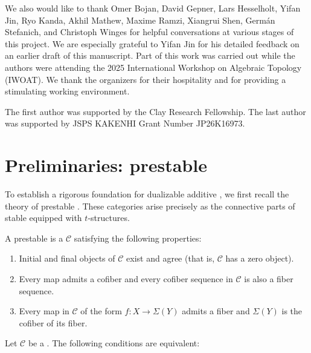 \documentclass[a4paper,10pt, oneside]{amsart}
\begin{document}
We also would like to thank Omer Bojan, David Gepner, Lars Hesselholt, Yifan Jin, Ryo Kanda, Akhil Mathew, Maxime Ramzi, Xiangrui Shen, Germán Stefanich, and Christoph Winges for helpful conversations at various stages of this project. We are especially grateful to Yifan Jin for his detailed feedback on an earlier draft of this manuscript. 
Part of this work was carried out while the authors were attending the 2025 International Workshop on Algebraic Topology (IWOAT). We thank the organizers for their hospitality and for providing a stimulating working environment.


The first author was supported by the Clay Research Fellowship. The last author was supported by JSPS KAKENHI Grant Number JP26K16973.
	
	
	\section{Preliminaries: prestable \infcats}\label{section1}
	To establish a rigorous foundation for dualizable additive \infcats, we first recall the theory of prestable \infcats. These categories arise precisely as the connective parts of stable \infcats equipped with $t$-structures.
	
	\begin{de}\label{defpst}
		A prestable \infcat is a \infcat $\mathcal{C}$ satisfying the following properties:
		
		\begin{enumerate}[label=(\arabic*),font=\normalfont]
			\item Initial and final objects of $\mathcal{C}$ exist and agree (that is, $\mathcal{C}$ has a zero object).
			\item Every map admits a cofiber and every cofiber sequence in $\mathcal{C}$ is also a fiber sequence.
			\item Every map in $\mathcal{C}$ of the form $f: X \rightarrow \Sigma(Y)$ admits a fiber and $\Sigma(Y)$ is the cofiber of its fiber.
		\end{enumerate}
	
	\end{de}
	\begin{prop}\label{prestcriterion}
		Let $\mathcal{C}$ be a \infcat. The following conditions are equivalent:
		
	\end{prop}
	
\end{document}
